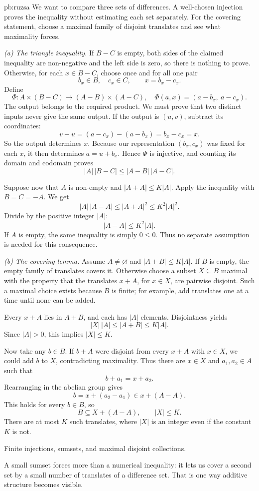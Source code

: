 \begin{solution}{pb:ruzsa}
\idea We want to compare three sets of differences. A well-chosen injection proves the inequality without estimating each set separately. For the covering statement, choose a maximal family of disjoint translates and see what maximality forces.

\writeup \emph{(a) The triangle inequality.}
If $B-C$ is empty, both sides of the claimed inequality are non-negative and the left side is zero, so there is nothing to prove. Otherwise, for each $x\in B-C$, choose once and for all one pair
\[
b_x\in B,\quad c_x\in C,\qquad x=b_x-c_x.
\]
Define
\[
\Phi:A\times(B-C)\longrightarrow(A-B)\times(A-C),
\quad
\Phi(a,x)=(a-b_x,\ a-c_x).
\]
The output belongs to the required product. We must prove that two distinct inputs never give the same output. If the output is $(u,v)$, subtract its coordinates:
\[
v-u=(a-c_x)-(a-b_x)=b_x-c_x=x.
\]
So the output determines $x$. Because our representation $(b_x,c_x)$ was fixed for each $x$, it then determines $a=u+b_x$. Hence $\Phi$ is injective, and counting its domain and codomain proves
\[
\boxed{|A|\,|B-C|\le|A-B|\,|A-C|.}
\]

Suppose now that $A$ is non-empty and $|A+A|\le K|A|$. Apply the inequality with $B=C=-A$. We get
\[
|A|\,|A-A|\le|A+A|^2\le K^2|A|^2.
\]
Divide by the positive integer $|A|$:
\[
\boxed{|A-A|\le K^2|A|.}
\]
If $A$ is empty, the same inequality is simply $0\le0$. Thus no separate assumption is needed for this consequence.

\emph{(b) The covering lemma.}
Assume $A\ne\varnothing$ and $|A+B|\le K|A|$. If $B$ is empty, the empty family of translates covers it. Otherwise choose a subset $X\subseteq B$ maximal with the property that the translates $x+A$, for $x\in X$, are pairwise disjoint. Such a maximal choice exists because $B$ is finite; for example, add translates one at a time until none can be added.

Every $x+A$ lies in $A+B$, and each has $|A|$ elements. Disjointness yields
\[
|X|\,|A|\le|A+B|\le K|A|.
\]
Since $|A|>0$, this implies $|X|\le K$.

Now take any $b\in B$. If $b+A$ were disjoint from every $x+A$ with $x\in X$, we could add $b$ to $X$, contradicting maximality. Thus there are $x\in X$ and $a_1,a_2\in A$ such that
\[
b+a_1=x+a_2.
\]
Rearranging in the abelian group gives
\[
b=x+(a_2-a_1)\in x+(A-A).
\]
This holds for every $b\in B$, so
\[
\boxed{B\subseteq X+(A-A),\qquad |X|\le K.}
\]
There are at most $K$ such translates, where $|X|$ is an integer even if the constant $K$ is not.

\tools Finite injections, sumsets, and maximal disjoint collections.

\leads A small sumset forces more than a numerical inequality: it lets us cover a second set by a small number of translates of a difference set. That is one way additive structure becomes visible.
\end{solution}

